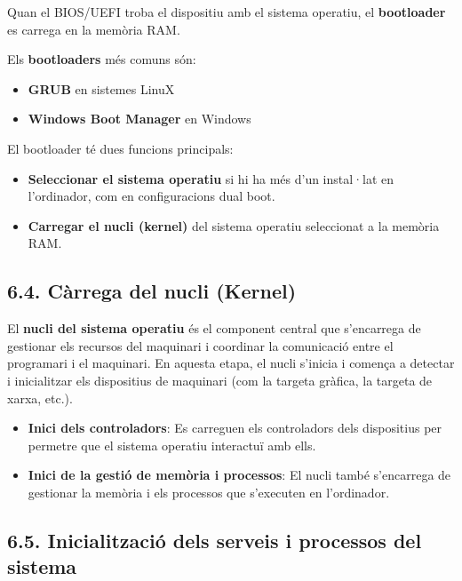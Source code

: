 \documentclass[
  a4paper,
]{article}
\providecommand{\tightlist}{%
  \setlength{\itemsep}{0pt}\setlength{\parskip}{0pt}}
\begin{document}
Quan el BIOS/UEFI troba el dispositiu amb el sistema operatiu, el
\textbf{bootloader} es carrega en la memòria RAM.

Els \textbf{bootloaders} més comuns són:

\begin{itemize}
\tightlist
\item
  \textbf{GRUB} en sistemes LinuX
\item
  \textbf{Windows Boot Manager} en Windows
\end{itemize}

El bootloader té dues funcions principals:

\begin{itemize}
\tightlist
\item
  \textbf{Seleccionar el sistema operatiu} si hi ha més d'un instal·lat
  en l'ordinador, com en configuracions dual boot.
\item
  \textbf{Carregar el nucli (kernel)} del sistema operatiu seleccionat a
  la memòria RAM.
\end{itemize}

\subsection{6.4. Càrrega del nucli
(Kernel)}\label{cuxe0rrega-del-nucli-kernel}

El \textbf{nucli del sistema operatiu} és el component central que
s'encarrega de gestionar els recursos del maquinari i coordinar la
comunicació entre el programari i el maquinari. En aquesta etapa, el
nucli s'inicia i comença a detectar i inicialitzar els dispositius de
maquinari (com la targeta gràfica, la targeta de xarxa, etc.).

\begin{itemize}
\item
  \textbf{Inici dels controladors}: Es carreguen els controladors dels
  dispositius per permetre que el sistema operatiu interactuï amb ells.
\item
  \textbf{Inici de la gestió de memòria i processos}: El nucli també
  s'encarrega de gestionar la memòria i els processos que s'executen en
  l'ordinador.
\end{itemize}

\subsection{6.5. Inicialització dels serveis i processos del
sistema}\label{inicialitzaciuxf3-dels-serveis-i-processos-del-sistema}
\end{document}
